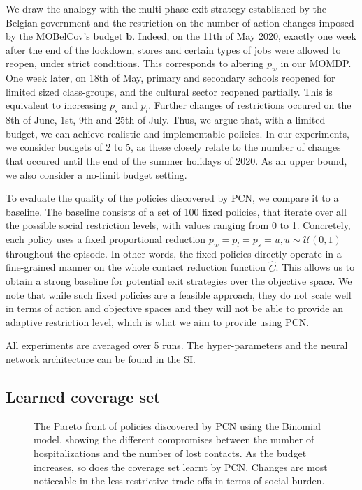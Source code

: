 \documentclass{article}
\newcommand{\momdpname}{MOBelCov}
\newcommand{\budget}{\bm{b}}
\begin{document}
We draw the analogy with the multi-phase exit strategy established by the Belgian government and the restriction on the number of action-changes imposed by the \momdpname's budget $\budget$. Indeed, on the 11th of May 2020, exactly one week after the end of the lockdown, stores and certain types of jobs were allowed to reopen, under strict conditions. This corresponds to altering $p_w$ in our MOMDP. One week later, on 18th of May, primary and secondary schools reopened for limited sized class-groups, and the cultural sector reopened partially. This is equivalent to increasing $p_s$ and $p_l$. Further changes of restrictions occured on the 8th of June, 1st, 9th and 25th of July. Thus, we argue that, with a limited budget, we can achieve realistic and implementable policies. In our experiments, we consider budgets of 2 to 5, as these closely relate to the number of changes that occured until the end of the summer holidays of 2020. As an upper bound, we also consider a no-limit budget setting.

To evaluate the quality of the policies discovered by PCN, we compare it to a baseline. The baseline consists of a set of 100 fixed policies, that iterate over all the possible social restriction levels, with values ranging from 0 to 1. Concretely, each policy uses a fixed proportional reduction $p_w=p_l=p_s=u, u\sim\mathcal{U}(0, 1)$ throughout the episode. In other words, the fixed policies directly operate in a fine-grained manner on the whole contact reduction function $\hat{C}$. This allows us to obtain a strong baseline for potential exit strategies over the objective space. We note that while such fixed policies are a feasible approach, they do not scale well in terms of action and objective spaces and they will not be able to provide an adaptive restriction level, which is what we aim to provide using PCN.

All experiments are averaged over 5 runs. The hyper-parameters and the neural network architecture can be found in the SI.


\subsection{Learned coverage set}

\begin{figure}
    \centering
    
    \caption{The Pareto front of policies discovered by PCN using the Binomial model, showing the different compromises between the number of hospitalizations and the number of lost contacts. As the budget increases, so does the coverage set learnt by PCN. Changes are most noticeable in the less restrictive trade-offs in terms of social burden.}
    \label{fig:pf-binomal-arh-budgets}
\end{figure}
\end{document}
